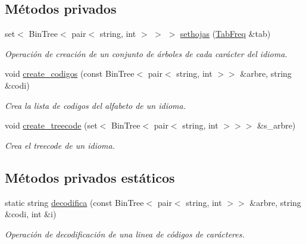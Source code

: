 \subsection*{Métodos privados}
\begin{DoxyCompactItemize}
\item 
set$<$ Bin\+Tree$<$ pair$<$ string, int $>$ $>$ $>$ \hyperlink{class_idioma_aa4a86dd82c04a280b32d98c775cf5eda}{sethojas} (\hyperlink{class_tab_freq}{Tab\+Freq} \&tab)
\begin{DoxyCompactList}\small\item\em Operación de creación de un conjunto de árboles de cada carácter del idioma. \end{DoxyCompactList}\item 
void \hyperlink{class_idioma_a30aeaf1fc288edfcb09a00e47cad834a}{create\+\_\+codigos} (const Bin\+Tree$<$ pair$<$ string, int $>$$>$ \&arbre, string \&codi)
\begin{DoxyCompactList}\small\item\em Crea la lista de codigos del alfabeto de un idioma. \end{DoxyCompactList}\item 
void \hyperlink{class_idioma_aa26f926dab1f528a879244f0a1c5f3e5}{create\+\_\+treecode} (set$<$ Bin\+Tree$<$ pair$<$ string, int $>$$>$$>$ \&s\+\_\+arbre)
\begin{DoxyCompactList}\small\item\em Crea el treecode de un idioma. \end{DoxyCompactList}\end{DoxyCompactItemize}
\subsection*{Métodos privados estáticos}
\begin{DoxyCompactItemize}
\item 
static string \hyperlink{class_idioma_a225fb55a6732d07e61bf310f5f29aa0e}{decodifica} (const Bin\+Tree$<$ pair$<$ string, int $>$$>$ \&arbre, string \&codi, int \&i)
\begin{DoxyCompactList}\small\item\em Operación de decodificación de una linea de códigos de carácteres. \end{DoxyCompactList}\end{DoxyCompactItemize}
